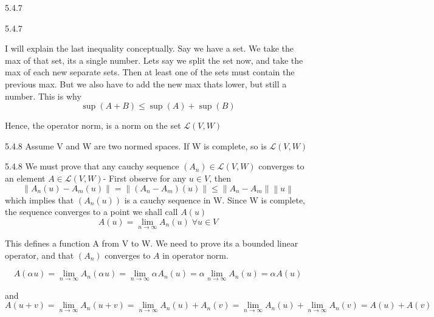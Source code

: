 \documentclass[a4paper,norsk]{article}
\renewcommand{\leq}{\leqslant}
\begin{document}
\begin{propositionbox}{5.4.7}{}
\begin{proofbox}{5.4.7}{}
\begin{itemize}
        
        I will explain the last inequality conceptually. Say we have a set. We take the max of that set, its a single number. Lets say we split the set now, and take the max of each new separate sets. Then at least one of the sets must contain the previous max. But we also have to add the new max thats lower, but still a number. This is why 
        \[
            \sup \left( A + B \right) \leq \sup \left( A \right) + \sup \left( B \right) 
        \]
    \end{itemize}

    Hence, the operator norm, is a norm on the set $ \mathcal{L} \left( V, W \right)  $ 
\end{proofbox}
\end{propositionbox}


\begin{theorembox}{5.4.8}{}
Assume V and W are two normed spaces. If W is complete, so is $ \mathcal{L} \left( V, W \right)  $ 

\begin{proofbox}{5.4.8}{}
    We must prove that any cauchy sequence $ \left( A_n \right) \in  \mathcal{L} \left( V, W \right)  $ converges to an element $ A \in \mathcal{L} \left( V, W \right)  $- First observe for any $ u \in V $, then
    \[
        \left\lVert A_n \left( u \right) - A_m \left( u \right)  \right\rVert = \left\lVert \left( A_n - A_m \right) \left( u \right)  \right\rVert \leq \left\lVert A_n - A_m \right\rVert \left\lVert u \right\rVert 
    \]
    which implies that $ \left( A_n \left( u \right)  \right)  $ is a cauchy sequence in W. Since W is complete, the sequence converges to a point we shall call $ A \left( u \right)  $ 
    \[
        A \left( u \right) = \lim_{n \to \infty} A_n \left( u \right) \; \forall u \in V
    \]
    
    This defines a function A from V to W. We need to prove its a bounded linear operator, and that $ \left( A_n \right)  $ converges to $ A $  in operator norm.

    \[
        A \left( \alpha_{}^{} u \right) = \lim_{n \to \infty} A_n \left( \alpha_{}^{} u \right) = \lim_{n \to \infty} \alpha_{}^{} A_n \left( u \right)   = \alpha_{}^{} \lim_{n \to \infty} A_n(u) = \alpha_{}^{} A \left( u \right) 
    \]

    and 
    \[
        A \left( u+v \right) = \lim_{n \to \infty} A_n \left( u+v \right) = \lim_{n \to \infty} A_n \left( u \right) + A_n \left( v \right) = \lim_{n \to \infty} A_n \left( u \right) + \lim_{n \to \infty} A_n \left( v \right)  = A(u) + A(v)
    \]


\end{proofbox}
\end{theorembox}
\end{document}
